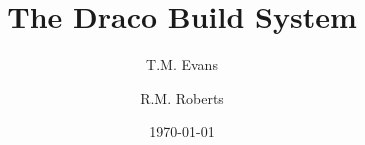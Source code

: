 \documentclass[reqno]{larep}
\begin{document}

\frontmatter

\title{The Draco Build System}
\author{T.M. Evans}
\author{R.M. Roberts}
\address{CCS--4, MS D409, Los Alamos National Security, LLC, Los
  Alamos, NM 87544}


\date{\today}

\end{document}
